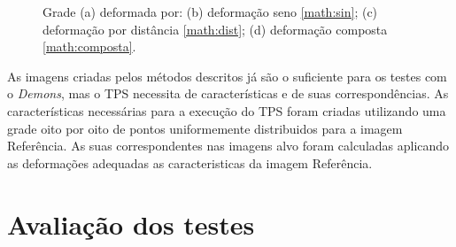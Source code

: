\begin{figure}[H]
\begin{subfigure}[t]{0.3\textwidth}
	  \label{fig:movingImageDistSin}
	\end{subfigure}
	\caption{Grade (a) deformada por: (b) deformação seno \ref{math:sin}; (c) deformação por distância \ref{math:dist}; 
				(d) deformação composta \ref{math:composta}. }
	\label{fig:deformacoes}
\end{figure}

	As imagens criadas pelos métodos descritos já são o suficiente para os testes com o \textit{Demons}, mas o TPS
necessita de características e de suas correspondências. As características necessárias para a execução do TPS foram 
criadas utilizando uma grade oito por oito de pontos uniformemente distribuidos para a imagem Referência. As suas 
correspondentes nas imagens alvo foram calculadas aplicando as deformações adequadas as caracteristicas da imagem 
Referência.

\section{Avaliação dos testes}

